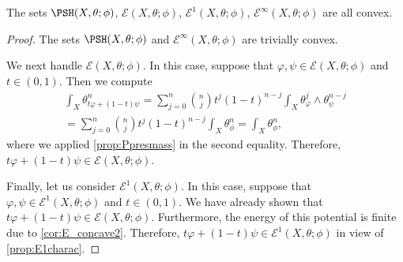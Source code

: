 \begin{corollary}\label{cor:E_classes_convex}
    The sets $\PSH(X,\theta;\phi)$, $\mathcal{E}(X,\theta;\phi)$, $\mathcal{E}^1(X,\theta;\phi)$, $\mathcal{E}^{\infty}(X,\theta;\phi)$ are all convex.
\end{corollary}
\begin{proof}
    The sets $\PSH(X,\theta;\phi)$ and $\mathcal{E}^{\infty}(X,\theta;\phi)$ are trivially convex.

    We next handle $\mathcal{E}(X,\theta;\phi)$. In this case, suppose that $\varphi,\psi \in \mathcal{E}(X,\theta;\phi)$ and $t\in (0,1)$. Then we compute
    \[
    \begin{split}
        \int_X \theta_{t\varphi+(1-t)\psi}^n=\sum_{j=0}^n \binom{n}{j}t^j (1-t)^{n-j} \int_X \theta_{\varphi}^j\wedge \theta_{\psi}^{n-j}\\
        =\sum_{j=0}^n \binom{n}{j}t^j (1-t)^{n-j} \int_X \theta_{\phi}^n=\int_X \theta_{\phi}^n,
    \end{split}
    \]
    where we applied \cref{prop:Ppresmass} in the second equality. Therefore, $t\varphi+(1-t)\psi \in \mathcal{E}(X,\theta;\phi)$.

    Finally, let us consider $\mathcal{E}^1(X,\theta;\phi)$. In this case, suppose that $\varphi,\psi \in \mathcal{E}^1(X,\theta;\phi)$ and $t\in (0,1)$. We have already shown that $t\varphi+(1-t)\psi \in \mathcal{E}(X,\theta;\phi)$. Furthermore, the energy of this potential is finite due to \cref{cor:E_concave2}. Therefore, $t\varphi+(1-t)\psi \in \mathcal{E}^1(X,\theta;\phi)$ in view of \cref{prop:E1charac}.
\end{proof}


